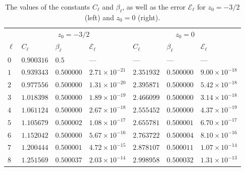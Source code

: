 \begin{table}[h]
	\caption{The values of the constants $C_\ell$ and $\beta_\ell$, as well as the error $\mathcal{E}_\ell$ for  $z_0=-3/2$ (left) and  $z_0=0$ (right).}
	\label{tab:Error}
	\centering
	\begin{tabular}{l|lll|lll}  \hline
		& \multicolumn{3}{c|}{$z_0=-3/2$}   & \multicolumn{3}{c}{$z_0=0$}  \\ \cline{2-7}
$\ell$   & $C_\ell$      & $\beta_\ell$    & $\mathcal{E}_\ell$     & $C_\ell$  & $\beta_\ell$  & $\mathcal{E}_\ell$ \\ 
		\hline
$0$      & $0.900316$   & $0.5$         & ---                    & ---         & ---         & ---         \\
$1$      & $0.939343$   & $0.500000$    & $2.71\times10^{-21}$   & $2.351932$  & $0.500000$  & $9.00\times10^{-18}$  \\
$2$      & $0.977556$   & $0.500000$    & $1.31\times10^{-20}$   & $2.395871$  & $0.500000$  & $5.42\times10^{-18}$  \\
$3$      & $1.018398$   & $0.500000$    & $1.89\times10^{-19}$   & $2.466099$  & $0.500000$  & $3.14\times10^{-18}$  \\
$4$      & $1.061124$   & $0.500000$    & $2.67\times10^{-18}$   & $2.555452$  & $0.500000$  & $4.37\times10^{-19}$  \\
$5$      & $1.105679$   & $0.500002$    & $1.08\times10^{-17}$   & $2.655781$  & $0.500001$  & $6.70\times10^{-17}$  \\
$6$      & $1.152042$   & $0.500000$    & $5.67\times10^{-16}$   & $2.763722$  & $0.500004$  & $8.10\times10^{-16}$  \\
$7$      & $1.200444$   & $0.500001$    & $4.72\times10^{-15}$   & $2.878107$  & $0.500011$  & $1.07\times10^{-14}$  \\
$8$      & $1.251569$   & $0.500037$    & $2.03\times10^{-14}$   & $2.998958$  & $0.500032$  & $1.31\times10^{-13}$   \\
		\hline
	\end{tabular}
\end{table}

